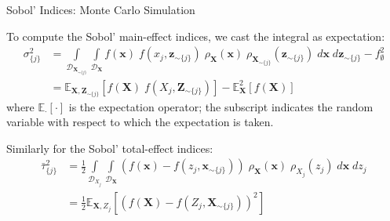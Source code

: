 \documentclass[english,aspectratio=169]{beamer}
\let\tempone\itemize
\let\temptwo\enditemize
\renewenvironment{itemize}{\tempone\addtolength{\itemsep}{0.35\baselineskip}}{\temptwo}
\begin{document}
\begin{frame}[fragile]{Sobol' Indices: Monte Carlo Simulation}
\small

\begin{itemize}
  \item To compute the Sobol' main-effect indices, we cast the integral as expectation:
  \begin{align*}
    \sigma_{\{ j \}}^2 & = \int\limits_{\mathcal{D}_{\bm{X}_{\sim \{j\}}}} \int\limits_{\mathcal{D}_{\bm{X}}} f(\bm{x}) \; f(x_j, \bm{z}_{\sim \{j\}}) \; \rho_{\bm{X}} (\bm{x}) \; \rho_{\bm{X}_{\sim \{j\}}} (\bm{z}_{\sim \{j\}}) \; d\bm{x} \; d\bm{z}_{\sim \{j\}} - f_\emptyset^2 \\
                       & = \mathbb{E}_{\bm{X}, \bm{Z}_{\sim \{ j \}}} \left[ f(\bm{X}) \; f(X_j, \bm{Z}_{\sim \{j\}}) \right] - \mathbb{E}^2_{\bm{X}} [f(\bm{X})]
  \end{align*}
  where $\mathbb{E}_{\cdot}[\cdot]$ is the expectation operator;
  the subscript indicates the random variable with respect to which the expectation is taken.
  
  \item Similarly for the Sobol' total-effect indices:
  \begin{align*}
    \bar{\tau}_{\{ j \}}^2 & = \frac{1}{2} \int\limits_{\mathcal{D}_{X_j}} \int\limits_{\mathcal{D}_{\bm{X}}} \left( f(\bm{x}) - f(z_j, \bm{x}_{\sim \{j\}}) \right) \; \rho_{\bm{X}} (\bm{x}) \; \rho_{X_j} (z_j) \; d\bm{x} \; dz_j \\
                           & = \frac{1}{2} \mathbb{E}_{\bm{X}, Z_j} \left[ \left( f(\bm{X}) - f(Z_j, \bm{X}_{\sim \{j\}}) \right)^2 \right]
  \end{align*}
\end{itemize}

\end{frame}
\end{document}
